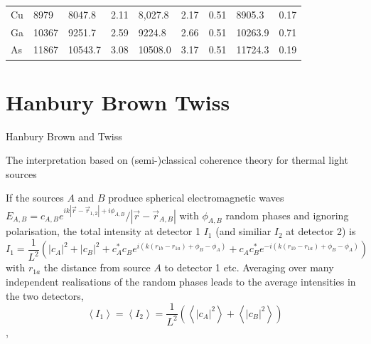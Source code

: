 \begin{table}[h]
\begin{tabular}{l|l|ll|lll|ll}
		Cu      & 8979                                                   & 8047.8                                                & 2.11                                                 & 8,027.8                                                & 2.17                                                 & 0.51                                                      & 8905.3                                                & 0.17                                                      \\
		Ga      & 10367                                                  & 9251.7                                                 & 2.59                                                 & 9224.8                                                 & 2.66                                                 & 0.51                                                      & 10263.9                                               & 0.71                                                      \\
		As      & 11867                                                  & 10543.7                                                & 3.08                                                 & 10508.0                                                & 3.17                                                 & 0.51                                                      & 11724.3                                               & 0.19                                                      \\ \hline
	\end{tabular}
\end{table}
\FloatBarrier
\section{Hanbury Brown Twiss}
Hanbury Brown and Twiss 

The interpretation based on (semi-)classical coherence theory for thermal light sources \cite{baym1997,goodman2000}

If the sources $A$ and $B$ produce spherical electromagnetic waves $E_{A,B}=c_{A,B} e^{i k\left|\vec{r}-\vec{r}_{1,2}\right|+i \phi_{A,B}} /\left|\vec{r}-\vec{r}_{A,B}\right|$ with $\phi_{A,B}$ random phases and ignoring polarisation, the total intensity at detector 1 $I_{1}$ (and similiar $I_{2}$ at detector 2) is
\begin{equation}
	I_{1} =
	\frac{1}{L^{2}}\left(
	|c_A|^{2}
	+|c_B|^{2}
	+c_A^{*} c_B     e^{ i\left(k\left(r_{1 b}-r_{1 a}\right)+\phi_{B}-\phi_{A}\right)}
	+c_A     c_B^{*} e^{-i\left(k\left(r_{1 b}-r_{1 a}\right)+\phi_{B}-\phi_{A}\right)}
	\right)
\end{equation}
with $r_{1 a}$ the distance from source $A$ to detector 1 etc. 
Averaging over many independent realisations of the random phases leads to the average intensities in the two detectors,
\begin{equation}
	\left\langle I_{1}\right\rangle=\left\langle I_{2}\right\rangle=\frac{1}{L^{2}}\left(\left\langle|c_A|^{2}\right\rangle+\left\langle|c_B|^{2}\right\rangle\right)
\end{equation}, 

